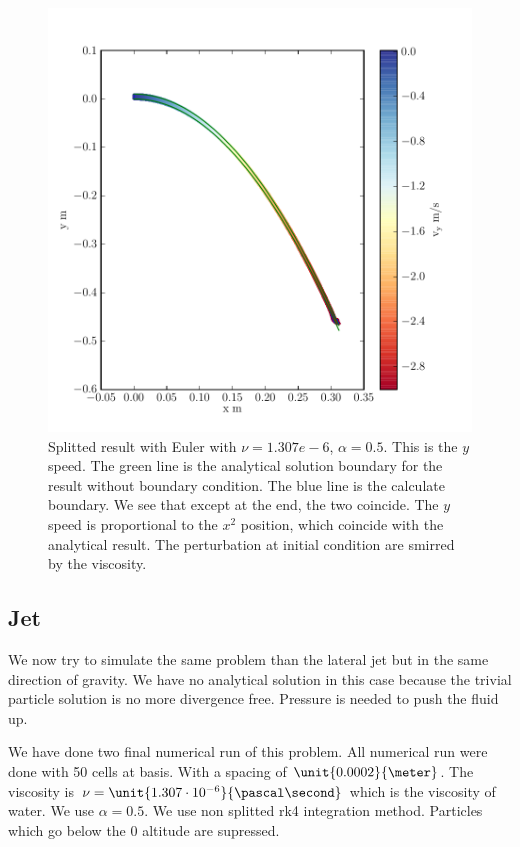 \begin{figure}
	\includegraphics{topology/lateral_jet/plot_10__2_293.pdf}
			\caption{Splitted result with Euler with $\nu=1.307e-6$, $\alpha=0.5$.
	This is the $y$ speed.
	The green line is the analytical solution boundary for the result without boundary condition.
	The blue line is the calculate boundary.
	We see that except at the end, the two coincide.
	The $y$ speed is proportional to the $x^2$ position, which coincide with the analytical result.
	The perturbation at initial condition are smirred by the viscosity.}
	\label{topo:extrap:lateral:10_2}
\end{figure}


\subsection{Jet}

We now try to simulate the same problem than the lateral jet but in the same direction of gravity.
We have no analytical solution in this case because the trivial particle solution is no more divergence free.
Pressure is needed to push the fluid up.

We have done two final numerical run of this problem.
All numerical run were done with 50 cells at basis. With a spacing of $\unit{0.0002}{\meter}$.
The viscosity is $\nu=\unit{1.307\cdot 10^{-6}}{\pascal\second}$ which is the viscosity of water.
We use $\alpha=0.5$. We use non splitted rk4 integration method.
Particles which go below the 0 altitude are supressed.

